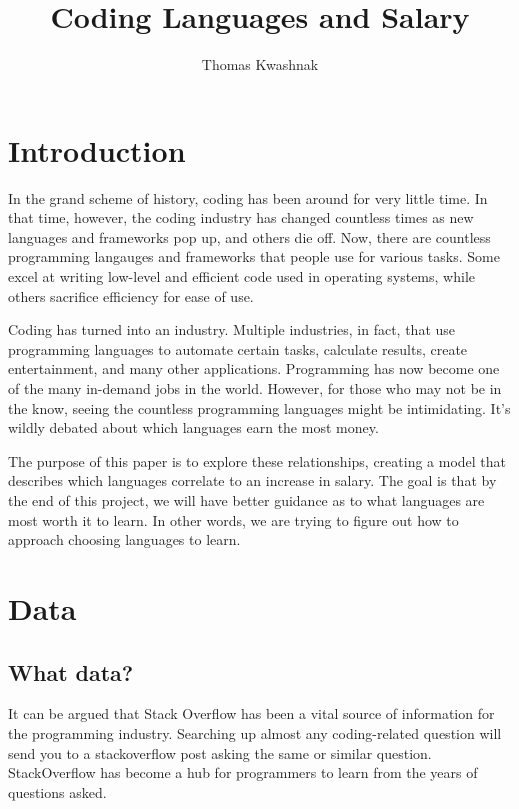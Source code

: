 \documentclass{report}
\title{Coding Languages and Salary}
\author{Thomas Kwashnak}
\begin{document}
\maketitle

\tableofcontents

\newpage

\chapter{Introduction}
In the grand scheme of history, coding has been around for very little time. In that time, however, the coding industry has changed countless times as new languages and frameworks pop up, and others die off. Now, there are countless programming langauges and frameworks that people use for various tasks. Some excel at writing low-level and efficient code used in operating systems, while others sacrifice efficiency for ease of use.

Coding has turned into an industry. Multiple industries, in fact, that use programming languages to automate certain tasks, calculate results, create entertainment, and many other applications. Programming has now become one of the many in-demand jobs in the world. However, for those who may not be in the know, seeing the countless programming languages might be intimidating. It's wildly debated about which languages earn the most money.

The purpose of this paper is to explore these relationships, creating a model that describes which languages correlate to an increase in salary. The goal is that by the end of this project, we will have better guidance as to what languages are most worth it to learn. In other words, we are trying to figure out how to approach choosing languages to learn.

\chapter{Data}

\section{What data?}

It can be argued that Stack Overflow has been a vital source of information for the programming industry. Searching up almost any coding-related question will send you to a stackoverflow post asking the same or similar question. StackOverflow has become a hub for programmers to learn from the years of questions asked.
\end{document}
